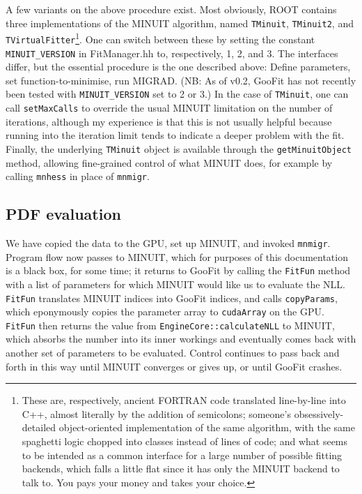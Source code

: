 \documentclass[12pt,pdflatex]{article}
\begin{document}
A few variants on the above procedure exist. Most obviously, ROOT contains three 
implementations of the MINUIT algorithm, named \texttt{TMinuit}, \texttt{TMinuit2}, 
and \texttt{TVirtualFitter}\footnote{These are, respectively, ancient FORTRAN code
translated line-by-line into C++, almost literally by the addition of semicolons; 
someone's obsessively-detailed object-oriented
implementation of the same algorithm, with the same spaghetti logic chopped into
classes instead of lines of code; and what seems to be intended as a common interface
for a large number of possible fitting backends, which falls a little flat since it
has only the MINUIT backend to talk to. You pays your money and takes your choice.}. 
One can switch between these by setting the constant 
\texttt{MINUIT\_VERSION} in FitManager.hh to, respectively, 1, 2, and 3. The interfaces differ,
but the essential procedure is the one described above: Define parameters, set
function-to-minimise, run MIGRAD. (NB: As of v0.2, GooFit has not recently been
tested with \texttt{MINUIT\_VERSION} set to 2 or 3.) In the case of \texttt{TMinuit},
one can call \texttt{setMaxCalls} to override the usual MINUIT limitation on the
number of iterations, although my experience is that this is not usually helpful
because running into the iteration limit tends to indicate a deeper problem with
the fit. Finally, the underlying \texttt{TMinuit} object is available through the
\texttt{getMinuitObject} method, allowing fine-grained control of what MINUIT does, 
for example by calling \texttt{mnhess} in place of \texttt{mnmigr}.

\subsection{PDF evaluation}

We have copied the data to the GPU, set up MINUIT, and invoked \texttt{mnmigr}. 
Program flow now passes to MINUIT, which for purposes of this documentation
is a black box, for some time; it returns to GooFit by calling the \texttt{FitFun}
method with a list of parameters for which MINUIT would like us to evaluate the NLL. 
\texttt{FitFun} translates MINUIT indices into GooFit indices, and calls \texttt{copyParams}, 
which eponymously copies the parameter array to \texttt{cudaArray} on the GPU. 
\texttt{FitFun} then returns the value from \texttt{EngineCore::calculateNLL}
to MINUIT, which absorbs the number into its inner workings and eventually comes
back with another set of parameters to be evaluated. Control continues to pass back
and forth in this way until MINUIT converges or gives up, or until GooFit crashes. 
\end{document}
